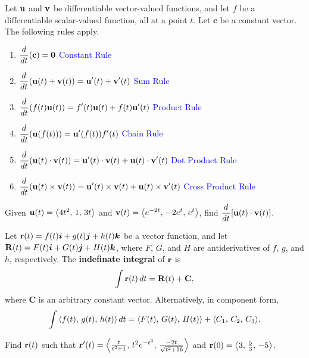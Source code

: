 \documentclass[../mathNotesPreamble]{subfiles}
\begin{document}
  \begin{thmBox*}
    Let ${\mathbf{u}}$ and ${\mathbf{v}}$ be differentiable vector-valued functions, and let $f$ be a differentiable scalar-valued function, all at a point $t$. Let $\mathbf c$ be a constant vector. The following rules apply.
    \begin{enumerate}
      \item $\displaystyle {\frac{d^{}}{dt^{}}}(\mathbf c)=\mathbf{0}$ \tab \textcolor{blue}{Constant Rule}
      \item $\displaystyle {\frac{d^{}}{dt^{}}}{\left({\mathbf{u}}(t)+{\mathbf{v}}(t)\right)}={\mathbf{u}}'(t)+{\mathbf{v}}'(t)$ \tab \textcolor{blue}{Sum Rule}
      \item $\displaystyle {\frac{d^{}}{dt^{}}}{\left(f(t){\mathbf{u}}(t)\right)}=f'(t){\mathbf{u}}(t)+f(t){\mathbf{u}}'(t)$ \tab \textcolor{blue}{Product Rule}
      \item $\displaystyle {\frac{d^{}}{dt^{}}}{\left({\mathbf{u}}(f(t))\right)}={\mathbf{u}}'{\left(f(t)\right)}f'(t)$ \tab \textcolor{blue}{Chain Rule}
      \item $\displaystyle {\frac{d^{}}{dt^{}}}{\left({\mathbf{u}}(t)\cdot{\mathbf{v}}(t)\right)}={\mathbf{u}}'(t)\cdot{\mathbf{v}}(t)+{\mathbf{u}}(t)\cdot{\mathbf{v}}'(t)$ \tab \textcolor{blue}{Dot Product Rule}
      \item $\displaystyle {\frac{d^{}}{dt^{}}}{\left({\mathbf{u}}(t)\times{\mathbf{v}}(t)\right)}={\mathbf{u}}'(t)\times{\mathbf{v}}(t)+{\mathbf{u}}(t)\times{\mathbf{v}}'(t)$ \tab \textcolor{blue}{Cross Product Rule}
    \end{enumerate}
  \end{thmBox*}
  \begin{ex*}
    Given ${\mathbf{u}}(t)={\left\langle 4t^2,\,1,\,3t \right\rangle}$ and ${\mathbf{v}}(t)={\left\langle e^{-2t},\,-2e^t,\,e^t \right\rangle}$, find $\displaystyle {\frac{d^{}}{dt^{}}}{\left[{\mathbf{u}}(t)\cdot{\mathbf{v}}(t)\right]}$.
  \end{ex*}
  \pagebreak
  
  \begin{defn*}
    Let ${\mathbf{r}}(t)=f(t) {\bm{i}}+g(t) {\bm{j}}+h(t) {\bm{k}}$ be a vector function, and let \newline $\mathbf R(t)=F(t) {\bm{i}}+G(t) {\bm{j}}+H(t) {\bm{k}}$, where $F$, $G$, and $H$ are antiderivatives of $f$, $g$, and $h$, respectively. The \textbf{indefinate integral} of ${\mathbf{r}}$ is
      \[\int{\mathbf{r}}(t)\,dt=\mathbf R(t)+\mathbf C,\]
    where $\mathbf C$ is an arbitrary constant vector. Alternatively, in component form,
      \[\int{\left\langle f(t),\,g(t),\,h(t) \right\rangle}\,dt={\left\langle F(t),\,G(t),\,H(t) \right\rangle}+{\left\langle C_1,\,C_2,\,C_3 \right\rangle}.\]
  \end{defn*}
  \begin{ex*}
    Find ${\mathbf{r}}(t)$ such that ${\mathbf{r}}'(t)={\left\langle \frac{t}{t^2+1},\,t^2e^{-t^3},\,\frac{-2t}{\sqrt{t^2+16}} \right\rangle}$ and ${\mathbf{r}}(0)={\left\langle 3,\,\frac{5}{3},\,-5 \right\rangle}$.
  \end{ex*}
  \pagebreak
\end{document}
